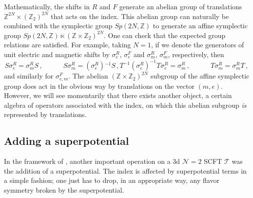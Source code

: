 \documentclass[11pt,letterpaper]{article}
\numberwithin{equation}{section}
\newcommand{\be}{\begin{equation}}
\newcommand{\ee}{\end{equation}}
\newcommand{\Z}{{\mathbb Z}}
\newcommand{\CN}{\mathcal{N}}
\newcommand{\CT}{\mathcal{T}}
\begin{document}
Mathematically, the shifts in $R$ and $F$ generate an abelian group of translations $\Z^{2N}\times (\Z_2)^{2N}$ that acts on the index. This abelian group can naturally be combined with the symplectic group $Sp(2N,\Z)$ to generate an affine symplectic group $Sp(2N,\Z) \ltimes (\Z\times \Z_2)^{2N}$. One can check that the expected group relations are satisfied. For example, taking $N=1$, if we denote the generators of unit electric and magnetic shifts by $\sigma_e^R,\,\sigma_e^F$ and $\sigma_m^R,\,\sigma_m^F$, respectively, then
%
\begin{subequations} \label{affrels}
\be S\sigma_e^R = \sigma_m^R S\,, \quad\qquad
S\sigma_m^R = (\sigma_e^R){}^{-1}S\,,\ee
\be T^{-1}(\sigma_e^R)^{-1}T\sigma_e^R = \sigma_m^R\,,\quad\qquad T\sigma_m^R = \sigma_m^R T\,, \ee
\end{subequations}
%
and similarly for $\sigma^F_{e,m}$. The abelian $(\Z\times \Z_2)^{2N}$ subgroup of the affine symplectic group does act in the obvious way by translations on the vector $(m,e)$. However, we will see momentarily that there exists another object, a certain algebra of operators associated with the index, on which this abelian subgroup \emph{is} represented by translations.



\subsection{Adding a superpotential}
\label{sec:W}


In the framework of \cite{DGG}, another important operation on a 3d $\CN=2$ SCFT $\CT$ was the addition of a superpotential. The index is affected by superpotential terms in a simple fashion; one just has to drop, in an appropriate way, any flavor symmetry broken by the superpotential.
\end{document}
